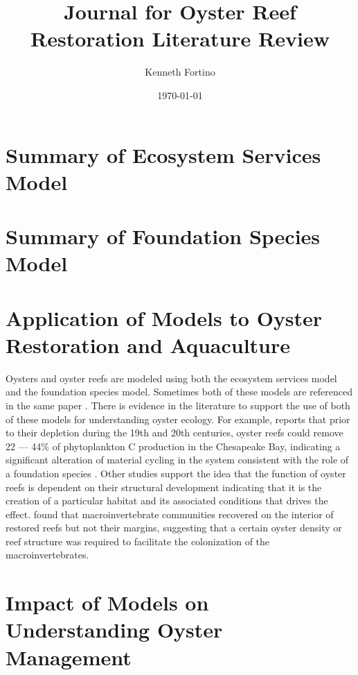 \documentclass{article}
\begin{document}
\title{Journal for Oyster Reef Restoration Literature Review}
\author{Kenneth Fortino}
\date{\today}

\maketitle

\section{Summary of Ecosystem Services Model}

\section{Summary of Foundation Species Model}

\section{Application of Models to Oyster Restoration and Aquaculture}

Oysters and oyster reefs are modeled using both the ecosystem services model and the foundation species model. Sometimes both of these models are referenced in the same paper \cite{mercaldo-allen_oyster_2023}. There is evidence in the literature to support the use of both of these models for understanding oyster ecology. For example,  reports that prior to their depletion during the 19th and 20th centuries, oyster reefs could remove 22 --- 44\% of phytoplankton C production in the Chesapeake Bay, indicating a significant alteration of material cycling in the system consistent with the role of a foundation species \cite{fields_foundation_2022}. Other studies support the idea that the function of oyster reefs is dependent on their structural development indicating that it is the creation of a particular habitat and its associated conditions that drives the effect.  found that macroinvertebrate communities recovered on the interior of restored reefs but not their margins, suggesting that a certain oyster density or reef structure was required to facilitate the colonization of the macroinvertebrates.


\section{Impact of Models on Understanding Oyster Management}








\end{document}
